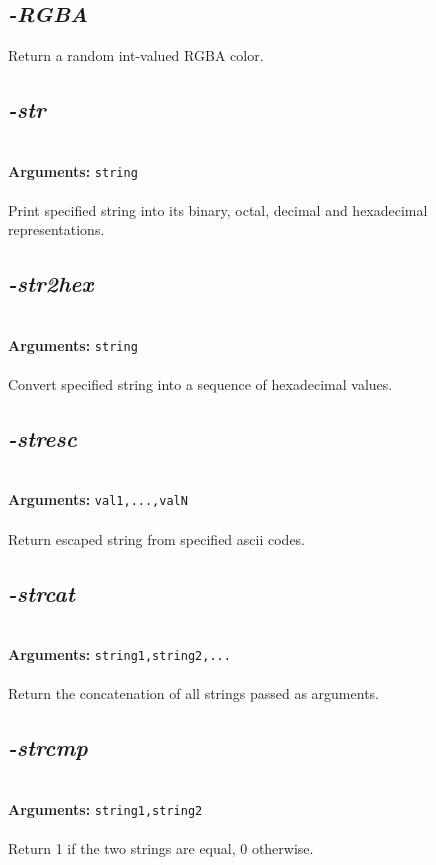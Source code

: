 \documentclass[a4paper,11pt,twoside]{book}
\begin{document}
\subsection{\emph{-RGBA} }\vspace*{-0.5em}
Return a random int-valued RGBA color.


\subsection{\emph{-str} }\vspace*{-0.5em}
~\\\textbf{Arguments: } 
{\small \texttt{string}}\\~\\
Print specified string into its binary, octal, decimal and hexadecimal representations.


\subsection{\emph{-str2hex} }\vspace*{-0.5em}
~\\\textbf{Arguments: } 
{\small \texttt{string}}\\~\\
Convert specified string into a sequence of hexadecimal values.


\subsection{\emph{-stresc} }\vspace*{-0.5em}
~\\\textbf{Arguments: } 
{\small \texttt{val1,...,valN}}\\~\\
Return escaped string from specified ascii codes.


\subsection{\emph{-strcat} }\vspace*{-0.5em}
~\\\textbf{Arguments: } 
{\small \texttt{string1,string2,...}}\\~\\
Return the concatenation of all strings passed as arguments.


\subsection{\emph{-strcmp} }\vspace*{-0.5em}
~\\\textbf{Arguments: } 
{\small \texttt{string1,string2}}\\~\\
Return 1 if the two strings are equal, 0 otherwise.
\end{document}
